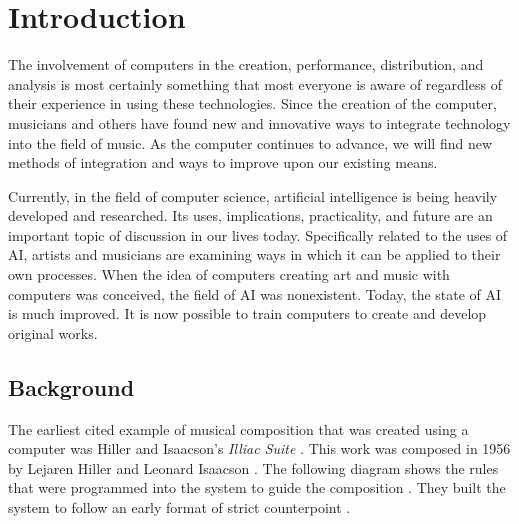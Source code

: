 \chapter{Introduction}
\label{ch:introduction}

The involvement of computers in the creation, performance, distribution, and analysis is most certainly something that most everyone is aware of regardless of their experience in using these technologies.  Since the creation of the computer, musicians and others have found new and innovative ways to integrate technology into the field of music.  As the computer continues to advance, we will find new methods of integration and ways to improve upon our existing means.

\vspace{\baselineskip}

Currently, in the field of computer science, artificial intelligence is being heavily developed and researched.  Its uses, implications, practicality, and future are an important topic of discussion in our lives today.  Specifically related to the uses of AI, artists and musicians are examining ways in which it can be applied to their own processes.  When the idea of computers creating art and music with computers was conceived, the field of AI was nonexistent.  Today, the state of AI is much improved.  It is now possible to train computers to create and develop original works.

\vspace{\baselineskip}

\section{Background}
\label{sec:background}

The earliest cited example of musical composition that was created using a computer was Hiller and Isaacson's \textit{Illiac Suite} \cite{Fernandez_2013}.  This work was composed in 1956 by Lejaren Hiller and Leonard Isaacson \cite{Brit_2018}.  The following diagram shows the rules that were programmed into the system to guide the composition \cite{Hiller_1992}.  They built the system to follow an early format of strict counterpoint \cite{Hiller_1992}.


